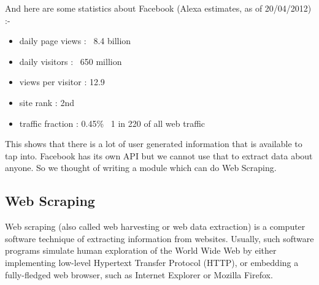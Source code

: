 And here are some statistics about Facebook (Alexa estimates, as of  20/04/2012) :-
\begin{itemize}
\item{daily page views : ~8.4 billion}
\item{daily visitors : ~650 million}
\item{views per visitor : 12.9}
\item{site rank : 2nd}
\item{traffic fraction : 0.45\% ~1  in  220   of all web traffic }
\end{itemize}


This shows that there is a lot of user generated information that is available to tap into. Facebook has its own API but we 
cannot use that to extract data about anyone. So we thought of writing a module which can do Web Scraping.

\subsection{Web Scraping}
Web scraping (also called web harvesting or web data extraction) is a computer software technique of extracting information from 
websites. Usually, such software programs simulate human exploration of the World Wide Web by either implementing low-level Hypertext 
Transfer Protocol (HTTP), or embedding a fully-fledged web browser, such as  Internet Explorer or Mozilla Firefox.\cite{wiki_scraping}

